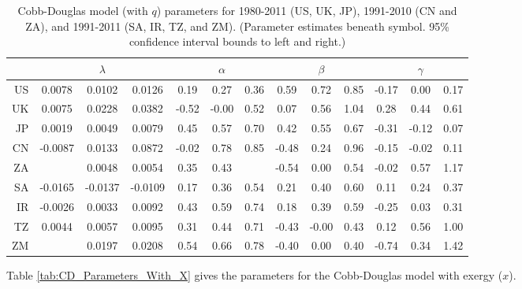 \documentclass[preprint,authoryear,12pt]{elsarticle}\usepackage{graphicx, color}
\begin{document}
\begin{table}[H]
\begin{center}
\caption{Cobb-Douglas model (with $q$) parameters for 1980-2011 (US, UK, JP), 1991-2010 (CN and ZA), and 1991-2011 (SA, IR, TZ, and ZM). (Parameter estimates beneath symbol. 95\% confidence interval bounds to left and right.)}
\label{tab:CD_Parameters_With_Q}
{\tiny
\begin{tabular}{r|ccc|ccc|ccc|ccc}
  \hline
 &   & $\lambda$ &   &   & $\alpha$ &   &   & $\beta$ &   &   & $\gamma$ &   \\ 
  \hline
US & 0.0078 & 0.0102 & 0.0126 & 0.19 & 0.27 & 0.36 & 0.59 & 0.72 & 0.85 & -0.17 & 0.00 & 0.17 \\ 
  UK & 0.0075 & 0.0228 & 0.0382 & -0.52 & -0.00 & 0.52 & 0.07 & 0.56 & 1.04 & 0.28 & 0.44 & 0.61 \\ 
  JP & 0.0019 & 0.0049 & 0.0079 & 0.45 & 0.57 & 0.70 & 0.42 & 0.55 & 0.67 & -0.31 & -0.12 & 0.07 \\ 
  CN & -0.0087 & 0.0133 & 0.0872 & -0.02 & 0.78 & 0.85 & -0.48 & 0.24 & 0.96 & -0.15 & -0.02 & 0.11 \\ 
  ZA &  & 0.0048 & 0.0054 & 0.35 & 0.43 &  & -0.54 & 0.00 & 0.54 & -0.02 & 0.57 & 1.17 \\ 
  SA & -0.0165 & -0.0137 & -0.0109 & 0.17 & 0.36 & 0.54 & 0.21 & 0.40 & 0.60 & 0.11 & 0.24 & 0.37 \\ 
  IR & -0.0026 & 0.0033 & 0.0092 & 0.43 & 0.59 & 0.74 & 0.18 & 0.39 & 0.59 & -0.25 & 0.03 & 0.31 \\ 
  TZ & 0.0044 & 0.0057 & 0.0095 & 0.31 & 0.44 & 0.71 & -0.43 & -0.00 & 0.43 & 0.12 & 0.56 & 1.00 \\ 
  ZM &  & 0.0197 & 0.0208 & 0.54 & 0.66 & 0.78 & -0.40 & 0.00 & 0.40 & -0.74 & 0.34 & 1.42 \\ 
   \hline
\end{tabular}
}
\end{center}
\end{table}



Table \ref{tab:CD_Parameters_With_X} gives the parameters for the Cobb-Douglas model with exergy ($x$).
\end{document}
